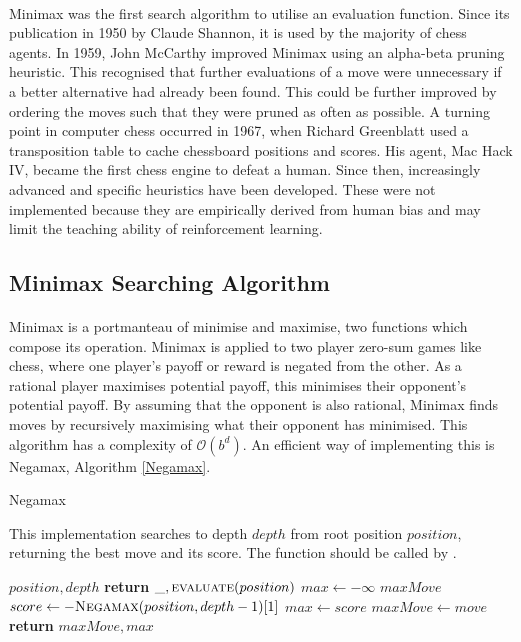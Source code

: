 \documentclass[12pt,a4paper]{book}
\begin{document}
\paragraph{} Minimax was the first search algorithm to utilise an evaluation function. Since its publication in 1950 by Claude Shannon, it is used by the majority of chess agents. \cite{shannonlegendary} In 1959, John McCarthy improved Minimax using an alpha-beta pruning heuristic. This recognised that further evaluations of a move were unnecessary if a better alternative had already been found. This could be further improved by ordering the moves such that they were pruned as often as possible. A turning point in computer chess occurred in 1967, when Richard Greenblatt used a transposition table to cache chessboard positions and scores. His agent, Mac Hack IV, became the first chess engine to defeat a human. \cite{russellNorvig} Since then, increasingly advanced and specific heuristics have been developed. These were not implemented because they are empirically derived from human bias and may limit the teaching ability of reinforcement learning.

\subsection{Minimax Searching Algorithm}

\paragraph{} Minimax is a portmanteau of minimise and maximise, two functions which compose its operation. Minimax is applied to two player zero-sum games like chess, where one player's payoff or reward is negated from the other. As a rational player maximises potential payoff, this minimises their opponent's potential payoff. By assuming that the opponent is also rational, Minimax finds moves by recursively maximising what their opponent has minimised. This algorithm has a complexity of $\mathcal{O}(b^d)$. \cite{carolus} An efficient way of implementing this is Negamax, Algorithm \ref{Negamax}.

\begin{algorithm}
  \caption{Negamax}\label{Negamax}
  This implementation searches to depth $depth$ from root position $position$, returning the best move and its score. The function should be called by .
  \begin{algorithmic}[1]
     {$position, depth$}
    \State \textbf{return} $\_, \Call{evaluate}{position}$
    \EndIf
    \State $max \gets -\infty$
    \State $maxMove$
    \State {}
    \State $score \gets -\Call{Negamax}{position, depth-1}[1]$
    \State {}
    \State $max \gets score$
    \State $maxMove \gets move$
	\EndIf
    \EndFor
    \State \textbf{return} $maxMove, max$
    \EndFunction
  \end{algorithmic}
\end{algorithm}
\end{document}
